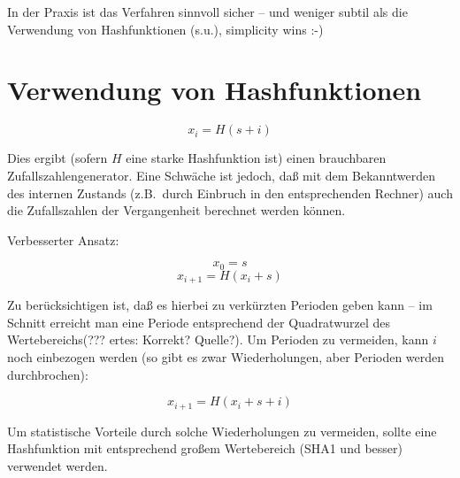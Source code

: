 In der Praxis ist das Verfahren sinnvoll sicher -- und weniger subtil als die Verwendung von Hashfunktionen (s.u.), simplicity wins :-)

\section{Verwendung von Hashfunktionen}

$$x_i = H(s+i) $$

Dies ergibt (sofern $H$ eine starke Hashfunktion ist) einen brauchbaren Zufallszahlengenerator. Eine Schwäche ist jedoch, daß mit dem Bekanntwerden des internen Zustands (z.B.~durch Einbruch in den entsprechenden Rechner) auch die Zufallszahlen der Vergangenheit berechnet werden können.

Verbesserter Ansatz:

$$x_0 = s$$
$$x_{i+1} = H(x_i + s)$$

Zu berücksichtigen ist, daß es hierbei zu verkürzten Perioden geben kann -- im Schnitt erreicht man eine Periode entsprechend der Quadratwurzel des Wertebereichs(??? ertes: Korrekt? Quelle?). Um Perioden zu vermeiden, kann $i$ noch einbezogen werden (so gibt es zwar Wiederholungen, aber Perioden werden durchbrochen):

$$x_{i+1} = H(x_i + s + i)$$

Um statistische Vorteile durch solche Wiederholungen zu vermeiden, sollte eine Hashfunktion mit entsprechend großem Wertebereich (SHA1 und besser) verwendet werden.

